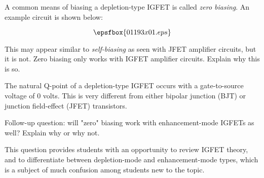 

A common means of biasing a depletion-type IGFET is called {\it zero biasing}.  An example circuit is shown below:

$$\epsfbox{01193x01.eps}$$

This may appear similar to {\it self-biasing} as seen with JFET amplifier circuits, but it is not.  Zero biasing only works with IGFET amplifier circuits.  Explain why this is so.







The natural Q-point of a depletion-type IGFET occurs with a gate-to-source voltage of 0 volts.  This is very different from either bipolar junction (BJT) or junction field-effect (JFET) transistors.

\vskip 10pt

Follow-up question: will "zero" biasing work with enhancement-mode IGFETs as well?  Explain why or why not.







This question provides students with an opportunity to review IGFET theory, and to differentiate between depletion-mode and enhancement-mode types, which is a subject of much confusion among students new to the topic.




